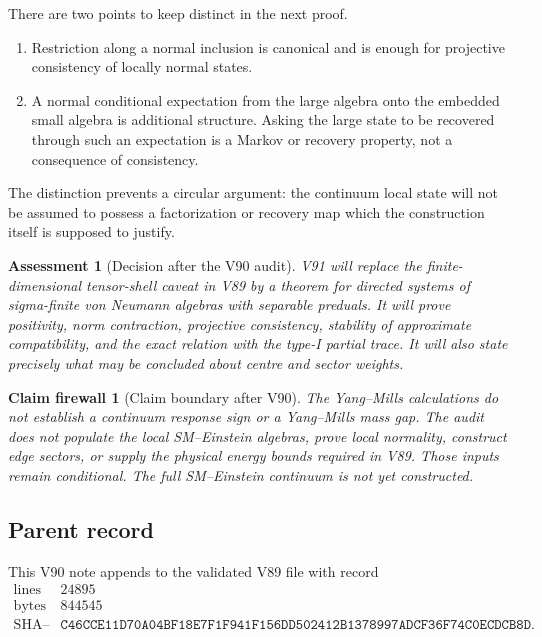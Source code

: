 \documentclass[11pt]{article}
\newtheorem{firewall}[theorem]{Claim firewall}
\newtheorem{assessment}[theorem]{Assessment}
\theoremstyle{remark}
\begin{document}
There are two points to keep distinct in the next proof.

\begin{enumerate}
\item Restriction along a normal inclusion is canonical and is enough
for projective consistency of locally normal states.
\item A normal conditional expectation from the large algebra onto
the embedded small algebra is additional structure.  Asking the
large state to be recovered through such an expectation is a Markov
or recovery property, not a consequence of consistency.
\end{enumerate}

The distinction prevents a circular argument: the continuum local
state will not be assumed to possess a factorization or recovery map
which the construction itself is supposed to justify.

\begin{assessment}[Decision after the V90 audit]
\label{ass:v12v90-decision}
V91 will replace the finite-dimensional tensor-shell caveat in V89
by a theorem for directed systems of sigma-finite von Neumann
algebras with separable preduals.  It will prove positivity, norm
contraction, projective consistency, stability of approximate
compatibility, and the exact relation with the type-I partial trace.
It will also state precisely what may be concluded about centre and
sector weights.
\end{assessment}

\begin{firewall}[Claim boundary after V90]
\label{fire:v12v90-claim}
The Yang--Mills calculations do not establish a continuum response
sign or a Yang--Mills mass gap.  The audit does not populate the
local SM--Einstein algebras, prove local normality, construct edge
sectors, or supply the physical energy bounds required in V89.
Those inputs remain conditional.  The full SM--Einstein continuum is
not yet constructed.
\end{firewall}

\subsection{Parent record}

This V90 note appends to the validated V89 file with record
\[
\begin{array}{c|c}
\text{lines}&24895\\
\text{bytes}&844545\\
\text{SHA--256}&
\texttt{C46CCE11D70A04BF18E7F1F941F156DD502412B1378997ADCF36F74C0ECDCB8D}.
\end{array}
\]
\end{document}
